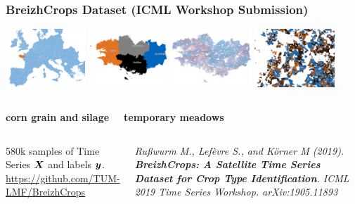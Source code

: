 \begin{frame}
\frametitle{BreizhCrops Dataset (ICML Workshop Submission)}

\begin{center}
\includegraphics[width=3cm]{images/map/europe}
\includegraphics[width=3cm]{images/map/regions}
\includegraphics[width=3cm]{images/map/breizh}
\includegraphics[width=3cm]{images/map/parcels}
\end{center}



\begin{columns}
	
	\textbf{corn grain and silage}
	
	
	\textbf{temporary meadows}
	
\end{columns}



\begin{columns}
	
	580k samples of Time Series $\M{X}$ and labels $\V{y}$. \Large \url{https://github.com/TUM-LMF/BreizhCrops}
	
	
	\small\raggedright
	\textsl{
		Rußwurm M., Lefèvre S., and Körner M (2019). \textbf{BreizhCrops: A Satellite Time Series Dataset for Crop Type Identification}. ICML 2019 Time Series Workshop. arXiv:1905.11893
	}
	
\end{columns}

\end{frame}

